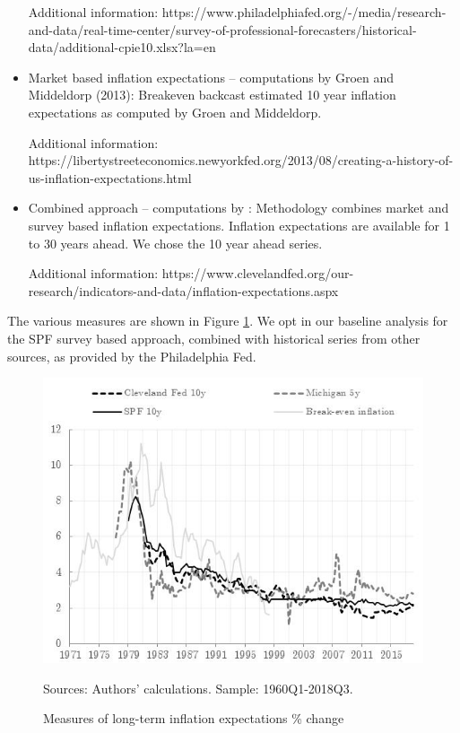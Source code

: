 \documentclass[11pt]{article}
\begin{document}
\begin{appendices}
\begin{itemize}
Additional information: https://www.philadelphiafed.org/-/media/research-and-data/real-time-center/survey-of-professional-forecasters/historical-data/additional-cpie10.xlsx?la=en 
\item Market based inflation expectations – computations by Groen and Middeldorp (2013): Breakeven backcast estimated 10 year inflation expectations as computed by Groen and Middeldorp.

Additional information: https://libertystreeteconomics.newyorkfed.org/2013/08/creating-a-history-of-us-inflation-expectations.html
\item Combined approach – computations by \cite{Cleveland12}: Methodology combines market and survey based inflation expectations. Inflation expectations are available for 1 to 30 years ahead. We chose the 10 year ahead series.

Additional information: https://www.clevelandfed.org/our-research/indicators-and-data/inflation-expectations.aspx
\end{itemize}

The various measures are shown in Figure \ref{fig:inflationexpectations}. We opt in our baseline analysis for the SPF survey based approach, combined with historical series from other sources, as provided by the Philadelphia Fed. 

\begin{figure}
\begin{center}
\caption{Measures of long-term inflation expectations \% change}\label{fig:inflationexpectations}
\includegraphics[scale = .75]{Chart_US_inflationexpectations.jpg}
\begin{minipage}{0.55\textwidth} {\footnotesize
Sources: Authors' calculations.
Sample: 1960Q1-2018Q3.\par}
\end{minipage}
\end{center}
\end{figure}

\clearpage

\end{appendices}


\clearpage

\newpage


\end{document}
